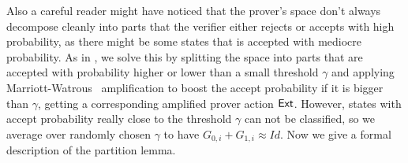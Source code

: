 Also a careful reader might have noticed that the prover's space don't always decompose cleanly into parts that the verifier either rejects or accepts with high probability, as there might be some states that is accepted with mediocre probability. As in \cite{arXiv:ChiaChungYam19}, we solve this by splitting the space into parts that are accepted with probability higher or lower than a small threshold $\gamma$ and applying Marriott-Watrous~\cite{marriott2005quantum} amplification to boost the accept probability if it is bigger than $\gamma$, getting a corresponding amplified prover action $\mathsf{Ext}$. However, states with accept probability really close to the threshold $\gamma$ can not be classified, so we average over randomly chosen $\gamma$ to have $G_{0,i}+G_{1,i} \approx Id$. Now we give a formal description of the partition lemma.

